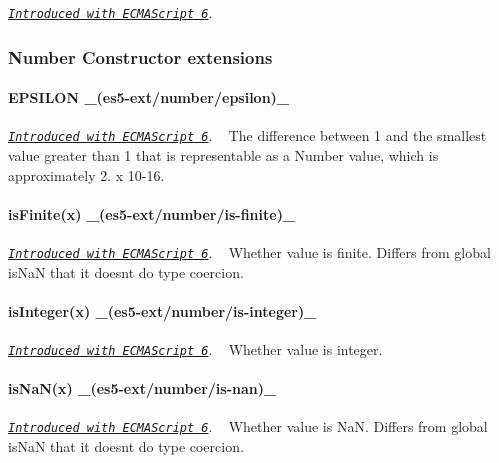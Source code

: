 \href{http://people.mozilla.org/~jorendorff/es6-draft.html#sec-math.trunc}{\tt {\itshape Introduced with E\+C\+M\+A\+Script 6}}. ~\newline
 \subsubsection*{Number Constructor extensions}

\paragraph*{E\+P\+S\+I\+L\+ON \+\_\+(es5-\/ext/number/epsilon)\+\_\+}

\href{http://people.mozilla.org/~jorendorff/es6-draft.html#sec-number.epsilon}{\tt {\itshape Introduced with E\+C\+M\+A\+Script 6}}. ~\newline
 The difference between 1 and the smallest value greater than 1 that is representable as a Number value, which is approximately 2. x 10-\/16.

\paragraph*{is\+Finite(x) \+\_\+(es5-\/ext/number/is-\/finite)\+\_\+}

\href{http://people.mozilla.org/~jorendorff/es6-draft.html#sec-number.isfinite}{\tt {\itshape Introduced with E\+C\+M\+A\+Script 6}}. ~\newline
Whether value is finite. Differs from global is\+NaN that it doesn\textquotesingle{}t do type coercion.

\paragraph*{is\+Integer(x) \+\_\+(es5-\/ext/number/is-\/integer)\+\_\+}

\href{http://people.mozilla.org/~jorendorff/es6-draft.html#sec-number.isinteger}{\tt {\itshape Introduced with E\+C\+M\+A\+Script 6}}. ~\newline
Whether value is integer.

\paragraph*{is\+Na\+N(x) \+\_\+(es5-\/ext/number/is-\/nan)\+\_\+}

\href{http://people.mozilla.org/~jorendorff/es6-draft.html#sec-number.isnan}{\tt {\itshape Introduced with E\+C\+M\+A\+Script 6}}. ~\newline
Whether value is NaN. Differs from global is\+NaN that it doesn\textquotesingle{}t do type coercion.

